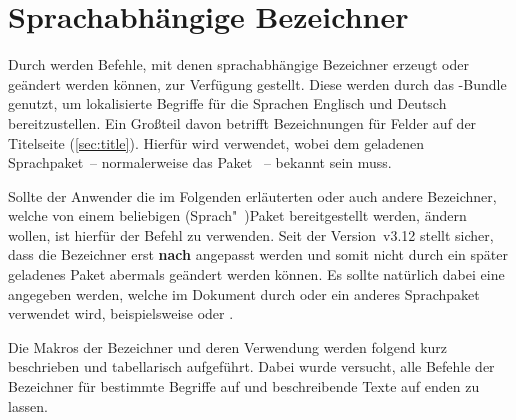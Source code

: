 \section{Sprachabhängige Bezeichner}
\label{sec:localization}
%
%
Durch \KOMAScript{} werden Befehle, mit denen sprachabhängige Bezeichner 
erzeugt oder geändert werden können, zur Verfügung gestellt. Diese werden durch 
das \TUDScript-Bundle genutzt, um lokalisierte Begriffe für die Sprachen 
Englisch und Deutsch bereitzustellen. Ein Großteil davon betrifft Bezeichnungen 
für Felder auf der Titelseite (\autoref{sec:title}). Hierfür wird
verwendet, wobei  dem geladenen Sprachpaket~-- normalerweise das 
Paket ~-- bekannt sein muss.

Sollte der Anwender die im Folgenden erläuterten oder auch andere Bezeichner, 
welche von einem beliebigen (Sprach"~)Paket bereitgestellt werden, ändern 
wollen, ist hierfür der Befehl
zu verwenden. Seit der Version~v3.12 stellt \KOMAScript sicher, dass die 
Bezeichner erst \textbf{nach}  angepasst 
werden und somit nicht durch ein später geladenes Paket abermals geändert 
werden können. Es sollte natürlich dabei eine  angegeben werden, 
welche im Dokument durch  oder ein anderes Sprachpaket verwendet 
wird, beispielsweise  oder . 

Die Makros der Bezeichner und deren Verwendung werden folgend kurz beschrieben 
und tabellarisch aufgeführt. Dabei wurde versucht, alle Befehle der Bezeichner 
für bestimmte Begriffe auf  und beschreibende Texte auf 
 enden zu lassen.

